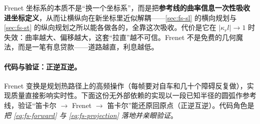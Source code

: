 \begin{insight}
Frenet 坐标系的本质不是“换一个坐标系”，而是把\textbf{参考线的曲率信息一次性吸收进坐标定义}，从而让横纵向在新坐标里近似解耦——\cref{sec:fs-sl} 的横向规划与 \cref{sec:fs-st} 的纵向规划之所以能各做各的，全靠这次吸收。代价是它在 $|\kappa_r l|\to1$ 时失效：曲率越大、偏移越大，这套“拉直”越不可信。Frenet 不是免费的几何魔法，而是一笔有息贷款——道路越直，利息越低。
\end{insight}

\paragraph{代码与验证：正逆互逆。}
Frenet 变换是规划热路径上的高频操作（每帧要对自车和几十个障碍反复做），实现质量直接影响实时性。下面这份无外部依赖的实现以一段已知半径的圆弧作参考线，验证“笛卡尔 $\to$ Frenet $\to$ 笛卡尔”能还原回原点（正逆互逆）。代码角色是\emph{把 \cref{eq:fs-forward} 与 \cref{eq:fs-projection} 落地并亲眼验证}。

